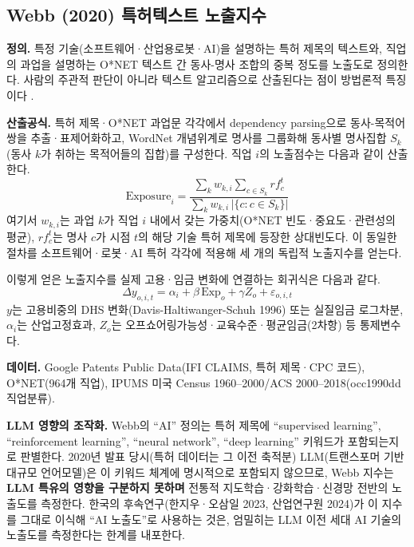 \documentclass[11pt]{article}
\begin{document}
\subsection{Webb (2020) 특허텍스트 노출지수}
\label{sec:webb}

\textbf{정의.} 특정 기술(소프트웨어·산업용로봇·AI)을 설명하는 특허 제목의 텍스트와, 직업의 과업을 설명하는 O*NET 텍스트 간 동사-명사 조합의 중복 정도를 노출도로 정의한다. 사람의 주관적 판단이 아니라 텍스트 알고리즘으로 산출된다는 점이 방법론적 특징이다 \parencite{webb-2020-impact-artificial-intelligence-labor}.

\textbf{산출공식.} 특허 제목·O*NET 과업문 각각에서 dependency parsing으로 동사-목적어 쌍을 추출·표제어화하고, WordNet 개념위계로 명사를 그룹화해 동사별 명사집합 $S_k$(동사 $k$가 취하는 목적어들의 집합)를 구성한다. 직업 $i$의 노출점수는 다음과 같이 산출한다.
\begin{equation}
\text{Exposure}_i = \frac{\sum_{k} w_{k,i} \sum_{c \in S_k} rf^t_c}{\sum_{k} w_{k,i}\,\lvert\{c : c \in S_k\}\rvert}
\label{eq:webb}
\end{equation}
여기서 $w_{k,i}$는 과업 $k$가 직업 $i$ 내에서 갖는 가중치(O*NET 빈도·중요도·관련성의 평균), $rf^t_c$는 명사 $c$가 시점 $t$의 해당 기술 특허 제목에 등장한 상대빈도다. 이 동일한 절차를 소프트웨어·로봇·AI 특허 각각에 적용해 세 개의 독립적 노출지수를 얻는다.

이렇게 얻은 노출지수를 실제 고용·임금 변화에 연결하는 회귀식은 다음과 같다.
\begin{equation}
\Delta y_{o,i,t} = \alpha_i + \beta\, \text{Exp}_o + \gamma Z_o + \varepsilon_{o,i,t}
\label{eq:webb-reg}
\end{equation}
$y$는 고용비중의 DHS 변화(Davis-Haltiwanger-Schuh 1996) 또는 실질임금 로그차분, $\alpha_i$는 산업고정효과, $Z_o$는 오프쇼어링가능성·교육수준·평균임금(2차항) 등 통제변수다.

\textbf{데이터.} Google Patents Public Data(IFI CLAIMS, 특허 제목·CPC 코드), O*NET(964개 직업), IPUMS 미국 Census 1960--2000/ACS 2000--2018(occ1990dd 직업분류).

\textbf{LLM 영향의 조작화.} Webb의 ``AI'' 정의는 특허 제목에 ``supervised learning'', ``reinforcement learning'', ``neural network'', ``deep learning'' 키워드가 포함되는지로 판별한다. 2020년 발표 당시(특허 데이터는 그 이전 축적분) LLM(트랜스포머 기반 대규모 언어모델)은 이 키워드 체계에 명시적으로 포함되지 않으므로, Webb 지수는 \textbf{LLM 특유의 영향을 구분하지 못하며} 전통적 지도학습·강화학습·신경망 전반의 노출도를 측정한다. 한국의 후속연구(한지우·오삼일 2023, 산업연구원 2024)가 이 지수를 그대로 이식해 ``AI 노출도''로 사용하는 것은, 엄밀히는 LLM 이전 세대 AI 기술의 노출도를 측정한다는 한계를 내포한다.
\end{document}
